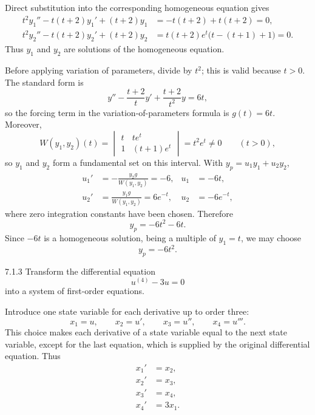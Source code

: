 \documentclass[11pt,oneside]{article}
\begin{document}
\begin{solution}
Direct substitution into the corresponding homogeneous equation gives
\[
\begin{aligned}
    t^2y_1''-t(t+2)y_1'+(t+2)y_1
        &=-t(t+2)+t(t+2)=0,\\
    t^2y_2''-t(t+2)y_2'+(t+2)y_2
        &=t(t+2)e^t\bigl(t-(t+1)+1\bigr)=0.
\end{aligned}
\]
Thus $y_1$ and $y_2$ are solutions of the homogeneous equation.

Before applying variation of parameters, divide by $t^2$; this is valid because $t>0$. The standard form is
\[
    y''-\frac{t+2}{t}y'
    +\frac{t+2}{t^2}y
    =6t,
\]
so the forcing term in the variation-of-parameters formula is $g(t)=6t$. Moreover,
\[
    W(y_1,y_2)(t)
    =\begin{vmatrix}
        t & te^t\\
        1 & (t+1)e^t
    \end{vmatrix}
    =t^2e^t\ne0
    \qquad (t>0),
\]
so $y_1$ and $y_2$ form a fundamental set on this interval. With $y_p=u_1y_1+u_2y_2$,
\[
\begin{aligned}
    u_1'&=-\frac{y_2g}{W(y_1,y_2)}=-6,
    &u_1&=-6t,\\
    u_2'&=\frac{y_1g}{W(y_1,y_2)}=6e^{-t},
    &u_2&=-6e^{-t},
\end{aligned}
\]
where zero integration constants have been chosen. Therefore
\[
    y_p=-6t^2-6t.
\]
Since $-6t$ is a homogeneous solution, being a multiple of $y_1=t$, we may choose
\[
    \boxed{y_p=-6t^2}.
\]
\end{solution}

\begin{problem}{7.1.3}
Transform the differential equation
\[
    u^{(4)}-3u=0
\]
into a system of first-order equations.
\end{problem}

\begin{solution}
Introduce one state variable for each derivative up to order three:
\[
    x_1=u,
    \qquad
    x_2=u',
    \qquad
    x_3=u'',
    \qquad
    x_4=u'''.
\]
This choice makes each derivative of a state variable equal to the next state variable, except for the last equation, which is supplied by the original differential equation. Thus
\[
    \boxed{
    \begin{aligned}
        x_1'&=x_2,\\
        x_2'&=x_3,\\
        x_3'&=x_4,\\
        x_4'&=3x_1.
    \end{aligned}}
\]
\end{solution}
\end{document}
